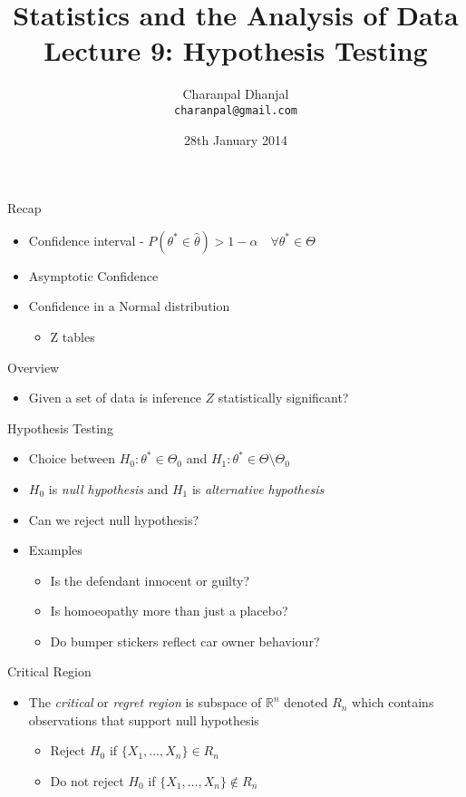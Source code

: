 \documentclass{beamer}
\title{Statistics and the Analysis of Data\\ Lecture 9: Hypothesis Testing}
\author{Charanpal Dhanjal \\ \texttt{charanpal@gmail.com}}
\institute{\'{E}cole des Ponts}
\date{28th January 2014}
\begin{document}
\frame{\titlepage}

\begin{frame}{Recap}  
\begin{itemize} 
 \item Confidence interval -  $P(\theta^* \in \hat{\theta}) > 1 - \alpha \quad \forall \theta^* \in \Theta $
 \item Asymptotic Confidence
 \item Confidence in a Normal distribution
\begin{itemize} 
\item Z tables 
\end{itemize}
\end{itemize} 
\end{frame}

\begin{frame}{Overview}
\begin{itemize} 
 \item Given a set of data is inference $Z$ statistically significant?
\end{itemize}
\end{frame}

\begin{frame}{Hypothesis Testing}  
\begin{itemize} 
\item Choice between $H_0: \theta^* \in \Theta_0$ and $H_1: \theta^* \in \Theta \setminus \Theta_0$
\item $H_0$ is \emph{null hypothesis} and $H_1$ is \emph{alternative hypothesis} 
\item Can we reject null hypothesis? 
\item Examples 
\begin{itemize} 
\item Is the defendant innocent or guilty? 
\item Is homoeopathy more than just a placebo? 
\item Do bumper stickers reflect car owner behaviour? 
\end{itemize}
\end{itemize}
\end{frame}

\begin{frame}{Critical Region} 
\begin{itemize} 
 \item The \emph{critical} or \emph{regret region} is subspace of $\mathbb{R}^n$ denoted $R_n$ which contains observations that support null hypothesis 
 \begin{itemize}
 \item Reject $H_0$ if $\{X_1, \ldots, X_n\} \in R_n$ 
 \item Do not reject $H_0$ if $\{X_1, \ldots, X_n\} \notin R_n$ 
 \end{itemize} 
\end{itemize}
\end{frame}
\end{document}
